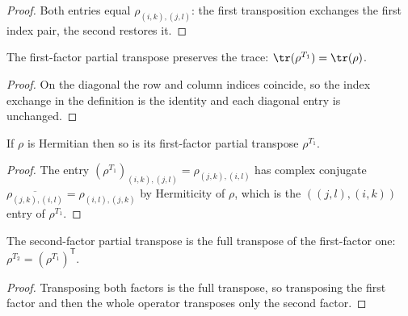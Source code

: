 \begin{proof}
    \leanok
    Both entries equal $\rho_{(i,k),(j,l)}$: the first transposition exchanges the
    first index pair, the second restores it.
\end{proof}

\begin{theorem}
    \label{thm:trace_partial_transpose_left}
    \leanok
    The first-factor partial transpose preserves the trace:
    $\tr(\rho^{T_1})=\tr(\rho)$.
\end{theorem}

\begin{proof}
    \leanok
    On the diagonal the row and column indices coincide, so the index exchange in
    the definition is the identity and each diagonal entry is unchanged.
\end{proof}

\begin{theorem}
    \label{thm:partial_transpose_left_hermitian}
    \leanok
    If $\rho$ is Hermitian then so is its first-factor partial transpose
    $\rho^{T_1}$.
\end{theorem}

\begin{proof}
    \leanok
    The entry $(\rho^{T_1})_{(i,k),(j,l)}=\rho_{(j,k),(i,l)}$ has complex
    conjugate $\overline{\rho_{(j,k),(i,l)}}=\rho_{(i,l),(j,k)}$ by Hermiticity of
    $\rho$, which is the $((j,l),(i,k))$ entry of $\rho^{T_1}$.
\end{proof}

\begin{theorem}
    \label{thm:partial_transpose_right_eq_transpose_left}
    \leanok
    The second-factor partial transpose is the full transpose of the first-factor
    one: $\rho^{T_2}=(\rho^{T_1})^{\mathsf T}$.
\end{theorem}

\begin{proof}
    \leanok
    Transposing both factors is the full transpose, so transposing the first
    factor and then the whole operator transposes only the second factor.
\end{proof}


